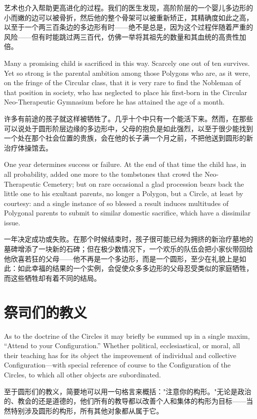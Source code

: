 \documentclass[12pt,UTF8]{ctexbook}
\begin{document}
艺术也介入帮助更高进化的过程。我们的医生发现，高阶阶层的一个婴儿多边形的小而嫩的边可以被骨折，然后他的整个骨架可以被重新矫正，其精确度如此之高，以至于一个两三百条边的多边形有时——绝不是总是，因为这个过程伴随着严重的风险——但有时能跳过两三百代，仿佛一举将其祖先的数量和其血统的高贵性加倍。

Many a promising child is sacrificed in this way. Scarcely one out of ten survives. Yet so strong is the parental ambition among those Polygons who are, as it were, on the fringe of the Circular class, that it is very rare to find the Nobleman of that position in society, who has neglected to place his first-born in the Circular Neo-Therapeutic Gymnasium before he has attained the age of a month.

许多有前途的孩子就这样被牺牲了。几乎十个中只有一个能活下来。然而，在那些可以说处于圆形阶层边缘的多边形中，父母的抱负是如此强烈，以至于很少能找到一个处在那个社会位置的贵族，会在他的长子满一个月之前，不把他送到圆形的新治疗体操馆去。

One year determines success or failure. At the end of that time the child has, in all probability, added one more to the tombstones that crowd the Neo-Therapeutic Cemetery; but on rare occasional a glad procession bears back the little one to his exultant parents, no longer a Polygon, but a Circle, at least by courtesy: and a single instance of so blessed a result induces multitudes of Polygonal parents to submit to similar domestic sacrifice, which have a dissimilar issue.

一年决定成功或失败。在那个时候结束时，孩子很可能已经为拥挤的新治疗墓地的墓碑增添了一块新的石碑；但在极少数情况下，一个欢乐的队伍会把小家伙带回给他欣喜若狂的父母——他不再是一个多边形，而是一个圆形，至少在礼貌上是如此：如此幸福的结果的一个实例，会促使众多多边形的父母忍受类似的家庭牺牲，而这些牺牲却有着不同的结局。

\chapter{祭司们的教义}

As to the doctrine of the Circles it may briefly be summed up in a single maxim, ``Attend to your Configuration.'' Whether political, ecclesiastical, or moral, all their teaching has for its object the improvement of individual and collective Configuration---with special reference of course to the Configuration of the Circles, to which all other objects are subordinated.

至于圆形们的教义，简要地可以用一句格言来概括："注意你的构形。"无论是政治的、教会的还是道德的，他们所有的教导都以改善个人和集体的构形为目标——当然特别涉及圆形的构形，所有其他对象都从属于它。
\end{document}
